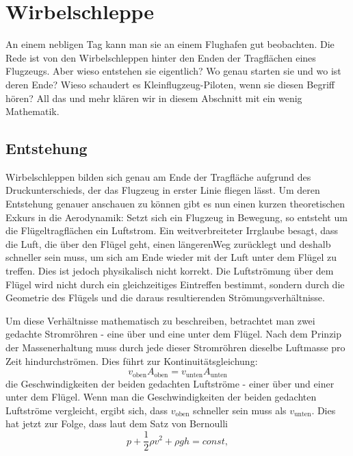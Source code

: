 %
%
%
\section{Wirbelschleppe}
An einem nebligen Tag kann man sie an einem Flughafen gut beobachten. 
Die Rede ist von den Wirbelschleppen hinter den Enden der Tragflächen eines Flugzeugs.
Aber wieso entstehen sie eigentlich? 
Wo genau starten sie und wo ist deren Ende?
Wieso schaudert es Kleinflugzeug-Piloten, wenn sie diesen Begriff hören?
All das und mehr klären wir in diesem Abschnitt mit ein wenig Mathematik.


\subsection{Entstehung}
Wirbelschleppen bilden sich genau am Ende der Tragfläche aufgrund des Druckunterschieds, der das Flugzeug in erster Linie fliegen lässt.
Um deren Entstehung genauer anschauen zu können gibt es nun einen kurzen theoretischen Exkurs in die Aerodynamik:
Setzt sich ein Flugzeug in Bewegung, so entsteht um die Flügeltragflächen ein Luftstrom.
Ein weitverbreiteter Irrglaube besagt, dass die Luft, die über den Flügel geht, einen \glqq längeren\grqq Weg zurücklegt und deshalb schneller sein muss, um sich am Ende wieder mit der Luft unter dem Flügel zu \glqq treffen\grqq.
Dies ist jedoch physikalisch nicht korrekt.
Die Luftströmung über dem Flügel wird nicht durch ein gleichzeitiges Eintreffen bestimmt, sondern durch die Geometrie des Flügels und die daraus resultierenden Strömungsverhältnisse.

Um diese Verhältnisse mathematisch zu beschreiben, betrachtet man zwei gedachte Stromröhren - eine über und eine unter dem Flügel. 
Nach dem Prinzip der Massenerhaltung muss durch jede dieser Stromröhren dieselbe Luftmasse pro Zeit hindurchströmen. Dies führt zur Kontinuitätsgleichung:
\begin{equation*}
v_{\text{oben}}A_{\text{oben}} 
=
v_{\text{unten}}A_{\text{unten}}
\end{equation*}
die Geschwindigkeiten der beiden gedachten Luftströme - einer über und einer unter dem Flügel.
Wenn man die Geschwindigkeiten der beiden gedachten Luftströme vergleicht, ergibt sich, dass $v_{\text{oben}}$ schneller sein muss als $v_{\text{unten}}$.
Dies hat jetzt zur Folge, dass laut dem Satz von Bernoulli 
\begin{equation}
    p+\frac{1}{2}\rho v^2+\rho gh
    =
    const
    \label{Wirbelringe:eq:Bernoulli},
\end{equation}

